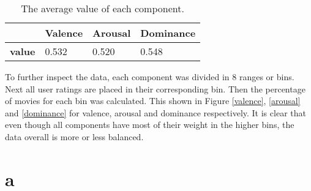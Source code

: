 \begin{table}[H]
\centering
\begin{tabular}{l|lll}
\textbf{}  & \textbf{Valence} & \textbf{Arousal} & \textbf{Dominance} \\ \hline
\textbf{value} & 0.532     	  & 0.520  			 & 0.548
\end{tabular}
\caption{The average value of each component.\label{avg-vals}}
\end{table}

To further inspect the data, each component was divided in 8 ranges or bins. Next all user ratings are placed in their corresponding bin. Then the percentage of movies for each bin was calculated. This shown in Figure \ref{valence}, \ref{arousal} and \ref{dominance} for valence, arousal and dominance respectively. It is clear that even though all components have most of their weight in the higher bins, the data overall is more or less balanced.   


\section{a }
